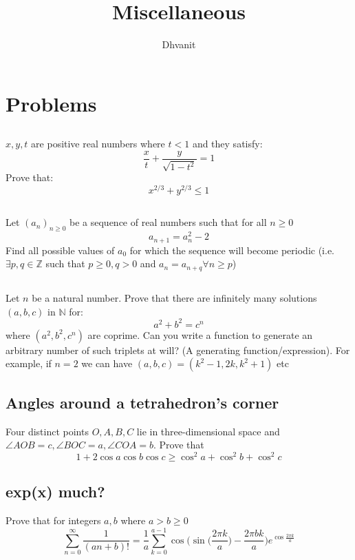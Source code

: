 \documentclass{article}
\title{Miscellaneous}
\author{Dhvanit}
\begin{document}
\maketitle
\section*{Problems}
\setcounter{section}{1}
\subsection{}
$x,y,t$ are positive real numbers where $t<1$ and they satisfy:
$$\frac{x}{t} + \frac{y}{\sqrt{1-t^2}} = 1$$
Prove that:
$$x^{2/3} + y^{2/3} \leq 1$$

\subsection{}
Let $(a_n)_{n\geq0}$ be a sequence of real numbers such that for all $n\geq0$
$$a_{n+1} = a_n^2 - 2$$
Find all possible values of $a_0$ for which the sequence will become periodic (i.e. $\exists p,q \in \mathbb{Z}$ such that $p\geq 0, q>0$ and $a_n = a_{n+q} \forall n\geq p$)

\subsection{}
Let $n$ be a natural number. Prove that there are infinitely many solutions $(a,b,c)$ in $\mathbb{N}$ for:
$$a^2 + b^2 = c^n$$ where $(a^2 ,b^2, c^n)$ are coprime. Can you write a function to generate an arbitrary number of such triplets at will? (A generating function/expression). For example, if $n=2$ we can have $(a,b,c) = (k^2-1, 2k, k^2+1)$ etc

\subsection{Angles around a tetrahedron's corner}
Four distinct points $O,A,B,C$ lie in three-dimensional space and $\angle AOB = c, \angle BOC = a, \angle COA = b$. Prove that
$$1+2\cos a\cos b\cos c \geq \cos^2 a + \cos^2b + \cos^2c$$

\subsection{exp(x) much?}
Prove that for integers $a,b$ where $a>b \geq 0$
$$\sum_{n=0}^{\infty} \frac {1}{(an+b)!} = \frac {1}{a} \sum_{k=0}^{a-1} \cos \bigg(\sin \bigg( \frac {2 \pi k}{a} \bigg) - \frac {2 \pi b k}{a} \bigg) e ^{\cos \frac {2 \pi k}{a}  }  $$
\end{document}
